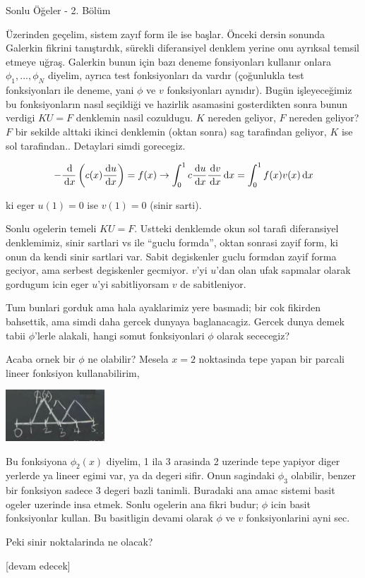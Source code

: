 \documentclass[12pt,fleqn]{article}\usepackage{../../common}
\begin{document}
Sonlu Öğeler - 2. Bölüm

Üzerinden geçelim, sistem zayıf form ile ise başlar. Önceki dersin sonunda
Galerkin fikrini tanıştırdık, sürekli diferansiyel denklem yerine onu ayrıksal
temsil etmeye uğraş. Galerkin bunun için bazı deneme fonsiyonları kullanır
onlara $\phi_1,...,\phi_N$ diyelim, ayrıca test fonksiyonları da vardır
(çoğunlukla test fonksiyonları ile deneme, yani $\phi$ ve $v$ fonksiyonları
aynıdır). Bugün işleyeceğimiz bu fonksiyonların nasıl seçildiği ve hazirlik
asamasini gosterdikten sonra bunun verdigi $KU = F$ denklemin nasil
cozuldugu. $K$ nereden geliyor, $F$ nereden geliyor? $F$ bir sekilde alttaki
ikinci denklemin (oktan sonra) sag tarafindan geliyor, $K$ ise sol
tarafindan.. Detaylari simdi gorecegiz.

$$
- \frac{\,\mathrm{d}}{\,\mathrm{d} x} \left( c(x) \frac{\,\mathrm{d} u}{\,\mathrm{d} x} \right) = f(x) \to
\int _{0}^{1} c \frac{\,\mathrm{d} u}{\,\mathrm{d} x} \frac{\,\mathrm{d} v}{\,\mathrm{d} x} \,\mathrm{d} x =
\int _{0}^{1} f(x) v(x) \,\mathrm{d} x
$$

ki eger $u(1)=0$ ise $v(1) = 0$ (sinir sarti).

Sonlu ogelerin temeli $KU = F$. Ustteki denklemde okun sol tarafi diferansiyel
denklemimiz, sinir sartlari vs ile ``guclu formda'', oktan sonrasi zayif form,
ki onun da kendi sinir sartlari var. Sabit degiskenler guclu formdan zayif forma
geciyor, ama serbest degiskenler gecmiyor. $v$'yi $u$'dan olan ufak sapmalar
olarak gordugum icin eger $u$'yi sabitliyorsam $v$ de sabitleniyor.

Tum bunlari gorduk ama hala ayaklarimiz yere basmadi; bir cok fikirden
bahsettik, ama simdi daha gercek dunyaya baglanacagiz. Gercek dunya demek tabii
$\phi$'lerle alakali, hangi somut fonksiyonlari $\phi$ olarak sececegiz?

Acaba ornek bir $\phi$ ne olabilir? Mesela $x=2$ noktasinda tepe yapan bir
parcali lineer fonksiyon kullanabilirim,

\includegraphics[width=10em]{compscieng_1_18_01.png}

Bu fonksiyona $\phi_2(x)$ diyelim, 1 ila 3 arasinda 2 uzerinde tepe yapiyor
diger yerlerde ya lineer egimi var, ya da degeri sifir. Onun sagindaki $\phi_3$
olabilir, benzer bir fonksiyon sadece 3 degeri bazli tanimli. Buradaki
ana amac sistemi basit ogeler uzerinde insa etmek. Sonlu ogelerin ana fikri
budur; $\phi$ icin basit fonksiyonlar kullan. Bu basitligin devami olarak
$\phi$ ve $v$ fonksiyonlarini ayni sec.

Peki sinir noktalarinda ne olacak? 


















[devam edecek]
\end{document}

